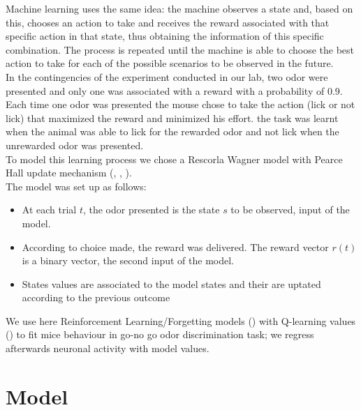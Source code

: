 Machine learning uses the same idea: the machine observes a state and, based on this, chooses an action to take and receives the reward associated with that specific action in that state, thus obtaining the information of this specific combination. The process is repeated until the machine is able to choose the best action to take for each of the possible scenarios to be observed in the future.\\In the contingencies of the experiment conducted in our lab, two odor were presented and only one was associated with a reward with a probability of 0.9. Each time one odor was presented the mouse chose to take the action (lick or not lick) that maximized the reward and minimized his effort. the task was learnt when the animal was able to lick for the rewarded odor and not lick when the unrewarded odor was presented.\\To model this learning process we chose a Rescorla Wagner model with Pearce Hall update mechanism (\cite{Li}, \cite{Costa}, \cite{Koppe}).\\
The model was set up as follows:
\begin{itemize}
    \item At each trial $t$, the odor presented is the state $s$ to be observed, input of the model.
    \item According to choice made, the reward was delivered. The reward vector $r(t)$ is a binary vector, the second input of the model.
    \item States values are associated to the model states and their are uptated according to the previous outcome
\end{itemize}
We use here Reinforcement Learning/Forgetting models (\cite{SuttonBarto}) with Q-learning values (\cite{Dayan1}) to fit mice behaviour in go-no go odor discrimination task; we regress afterwards neuronal activity with model values.
\section{Model}


